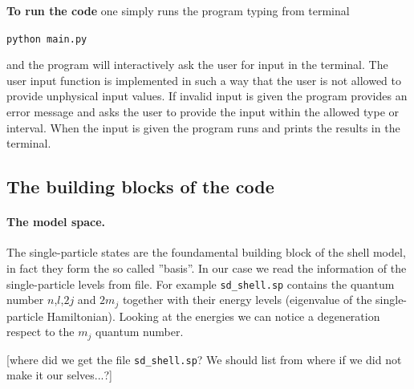 \documentclass[twoside]{article}
\begin{document}

\smallskip

\noindent \textbf{To run the code} one simply runs the program typing from terminal
\begin{center}\texttt{python main.py}\end{center} 
and the program will interactively ask the user for input in the terminal. The user input function is implemented in such a way that the user is not allowed to provide unphysical input values. If invalid input is given the program provides an error message and asks the user to provide the input within the allowed type or interval. When the input is given the program runs and prints the results in the terminal.

\subsection{The building blocks of the code}

\paragraph{The model space.} The single-particle states are the foundamental building block of the shell model, in fact they form the so called ''basis''. In our case we read the information of the single-particle levels from file. For example \texttt{sd\_shell.sp} contains the quantum number $n$,$l$,$2j$ and $2m_j$ together with their energy levels (eigenvalue of the single-particle Hamiltonian). Looking at the energies we can notice a degeneration respect to the $m_j$ quantum number.

[where did we get the file \texttt{sd\_shell.sp}? We should list from where if we did not make it our selves...?]
\end{document}
